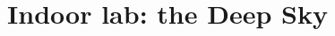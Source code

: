 \documentclass[11pt, preprint]{aastex}
\begin{document}
\title{\bf Indoor lab: the Deep Sky}

~
\vspace{-30pt}


\end{document}
